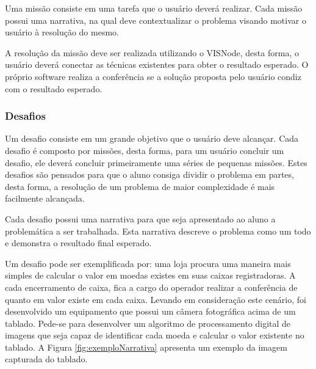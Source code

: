 \documentclass[
	12pt,				%
	oneside,			%
	a4paper,			%
	english,			%
	french,				%
	spanish,			%
	brazil,				%
	]{abntex2}
\begin{document}
Uma missão consiste em uma tarefa que o usuário deverá realizar. Cada missão possui uma narrativa, na qual deve contextualizar o problema visando motivar o usuário à resolução do mesmo.

A resolução da missão deve ser realizada utilizando o VISNode, desta forma, o usuário deverá conectar as técnicas existentes para obter o resultado esperado. O próprio software realiza a conferência se a solução proposta pelo usuário condiz com o resultado esperado.

\subsubsection{Desafios}
\label{desafio:moedas}
Um desafio consiste em um grande objetivo que o usuário deve alcançar. Cada desafio é composto por missões, desta forma, para um usuário concluir um desafio, ele deverá concluir primeiramente uma séries de pequenas missões. Estes desafios são pensados para que o aluno consiga dividir o problema em partes, desta forma, a resolução de um problema de maior complexidade é mais facilmente alcançada.

Cada desafio possui uma narrativa para que seja apresentado ao aluno a problemática a ser trabalhada. Esta narrativa descreve o problema como um todo e demonstra o resultado final esperado. 

Um desafio pode ser exemplificada por:
uma loja procura uma maneira mais simples de calcular o valor em moedas existes em suas caixas registradoras. A cada encerramento de caixa, fica a cargo do operador realizar a conferência de quanto em valor existe em cada caixa. Levando em consideração este cenário, foi desenvolvido um equipamento que possui um câmera fotográfica acima de um tablado. Pede-se para desenvolver um algoritmo de processamento digital de imagens que seja capaz de identificar cada moeda e calcular o valor existente no tablado. A Figura \ref{fig:exemploNarrativa} apresenta um exemplo da imagem capturada do tablado. 
\end{document}
